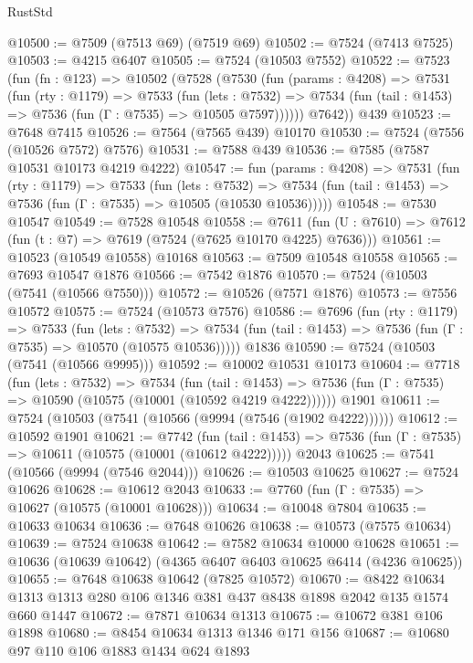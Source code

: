 \begin{lexlean}{RustStd}
\begin{coremodule}
@10500 := @7509 (@7513 @69) (@7519 @69)
@10502 := @7524 (@7413 @7525)
@10503 := @4215 @6407
@10505 := @7524 (@10503 @7552)
@10522 := @7523
    (fun (fn : @123) =>
    @10502
      (@7528
        (@7530
          (fun (params : @4208) =>
          @7531
            (fun (rty : @1179) =>
            @7533
              (fun (lets : @7532) =>
              @7534 (fun (tail : @1453) => @7536 (fun (Γ : @7535) => @10505 @7597))))))
        @7642))
    @439
@10523 := @7648 @7415
@10526 := @7564 (@7565 @439) @10170
@10530 := @7524 (@7556 (@10526 @7572) @7576)
@10531 := @7588 @439
@10536 := @7585 (@7587 @10531 @10173 @4219 @4222)
@10547 := fun (params : @4208) =>
  @7531
    (fun (rty : @1179) =>
    @7533
      (fun (lets : @7532) =>
      @7534 (fun (tail : @1453) => @7536 (fun (Γ : @7535) => @10505 (@10530 @10536)))))
@10548 := @7530 @10547
@10549 := @7528 @10548
@10558 := @7611
    (fun (U : @7610) => @7612 (fun (t : @7) => @7619 (@7524 (@7625 @10170 @4225) @7636)))
@10561 := @10523 (@10549 @10558) @10168
@10563 := @7509 @10548 @10558
@10565 := @7693 @10547 @1876
@10566 := @7542 @1876
@10570 := @7524 (@10503 (@7541 (@10566 @7550)))
@10572 := @10526 (@7571 @1876)
@10573 := @7556 @10572
@10575 := @7524 (@10573 @7576)
@10586 := @7696
    (fun (rty : @1179) =>
    @7533
      (fun (lets : @7532) =>
      @7534 (fun (tail : @1453) => @7536 (fun (Γ : @7535) => @10570 (@10575 @10536)))))
    @1836
@10590 := @7524 (@10503 (@7541 (@10566 @9995)))
@10592 := @10002 @10531 @10173
@10604 := @7718
    (fun (lets : @7532) =>
    @7534
      (fun (tail : @1453) =>
      @7536 (fun (Γ : @7535) => @10590 (@10575 (@10001 (@10592 @4219 @4222))))))
    @1901
@10611 := @7524 (@10503 (@7541 (@10566 (@9994 (@7546 (@1902 @4222))))))
@10612 := @10592 @1901
@10621 := @7742
    (fun (tail : @1453) => @7536 (fun (Γ : @7535) => @10611 (@10575 (@10001 (@10612 @4222)))))
    @2043
@10625 := @7541 (@10566 (@9994 (@7546 @2044)))
@10626 := @10503 @10625
@10627 := @7524 @10626
@10628 := @10612 @2043
@10633 := @7760 (fun (Γ : @7535) => @10627 (@10575 (@10001 @10628)))
@10634 := @10048 @7804
@10635 := @10633 @10634
@10636 := @7648 @10626
@10638 := @10573 (@7575 @10634)
@10639 := @7524 @10638
@10642 := @7582 @10634 @10000 @10628
@10651 := @10636 (@10639 @10642) (@4365 @6407 @6403 @10625 @6414 (@4236 @10625))
@10655 := @7648 @10638 @10642 (@7825 @10572)
@10670 := @8422 @10634 @1313 @1313 @280 @106 @1346 @381 @437 @8438 @1898 @2042 @135 @1574 @660 @1447
@10672 := @7871 @10634 @1313
@10675 := @10672 @381 @106 @1898
@10680 := @8454 @10634 @1313 @1346 @171 @156
@10687 := @10680 @97 @110 @106 @1883 @1434 @624 @1893

\end{coremodule}
\end{lexlean}
